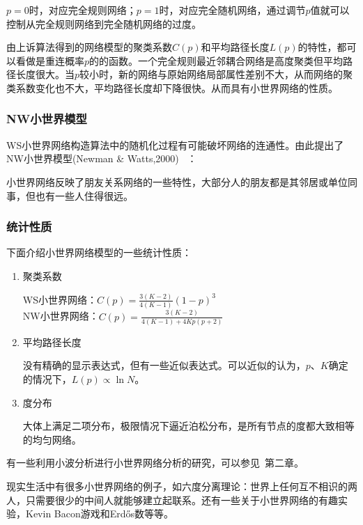 \documentclass[11pt]{article}
\begin{document}
		$p=0$时，对应完全规则网络；$p=1$时，对应完全随机网络，通过调节$p$值就可以控制从完全规则网络到完全随机网络的过度。\par
		由上诉算法得到的网络模型的聚类系数$C(p)$和平均路径长度$L(p)$的特性，都可以看做是重连概率$p$的的函数。一个完全规则最近邻耦合网络是高度聚类但平均路径长度很大。当$p$较小时，新的网络与原始网络局部属性差别不大，从而网络的聚类系数变化也不大，平均路径长度却下降很快。从而具有小世界网络的性质。
		
		\subsubsection*{NW小世界模型}
		WS小世界网络构造算法中的随机化过程有可能破坏网络的连通性。由此提出了NW小世界模型(Newman \& Watts,2000)~\cite{paper_03} ：
		\begin{center}
		\end{center}
		小世界网络反映了朋友关系网络的一些特性，大部分人的朋友都是其邻居或单位同事，但也有一些人住得很远。
		
		\subsubsection*{统计性质}
		下面介绍小世界网络模型的一些统计性质：
		\begin{enumerate}[1.]
			\item 聚类系数 \par
					WS小世界网络：$C(p) = \frac{3(K-2)}{4(K-1)}(1-p)^3$ \\
					NW小世界网络：$C(p) = \frac{3(K-2)}{4(K-1) + 4Kp(p+2)}$ 
			\item 平均路径长度 \par
					没有精确的显示表达式，但有一些近似表达式。可以近似的认为，$p、K$确定的情况下，$L(p) \propto \ln N$。
			\item	度分布 \par
					大体上满足二项分布，极限情况下逼近泊松分布，是所有节点的度都大致相等的均匀网络。
		\end{enumerate} \par
		有一些利用小波分析进行小世界网络分析的研究，可以参见~\cite{w1_book}第二章。 \par
		现实生活中有很多小世界网络的例子，如六度分离理论：世界上任何互不相识的两人，只需要很少的中间人就能够建立起联系。还有一些关于小世界网络的有趣实验，Kevin Bacon游戏和Erdős数等等。 
		
\end{document}
